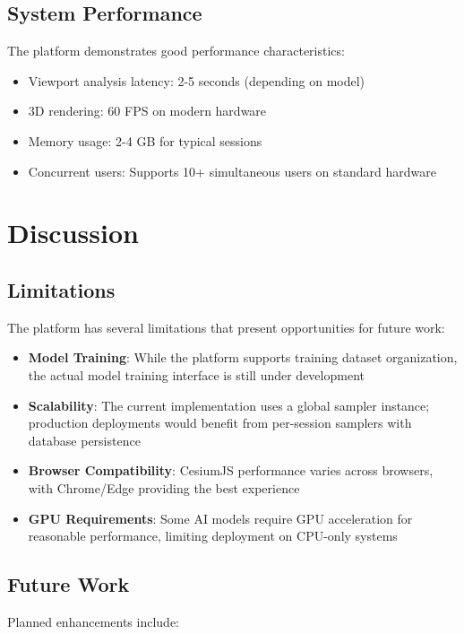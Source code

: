 \documentclass[conference]{IEEEtran}
\begin{document}
\subsection{System Performance}

The platform demonstrates good performance characteristics:
\begin{itemize}
    \item Viewport analysis latency: 2-5 seconds (depending on model)
    \item 3D rendering: 60 FPS on modern hardware
    \item Memory usage: 2-4 GB for typical sessions
    \item Concurrent users: Supports 10+ simultaneous users on standard hardware
\end{itemize}

\section{Discussion}

\subsection{Limitations}

The platform has several limitations that present opportunities for future work:

\begin{itemize}
    \item \textbf{Model Training}: While the platform supports training dataset organization, the actual model training interface is still under development
    \item \textbf{Scalability}: The current implementation uses a global sampler instance; production deployments would benefit from per-session samplers with database persistence
    \item \textbf{Browser Compatibility}: CesiumJS performance varies across browsers, with Chrome/Edge providing the best experience
    \item \textbf{GPU Requirements}: Some AI models require GPU acceleration for reasonable performance, limiting deployment on CPU-only systems
\end{itemize}

\subsection{Future Work}

Planned enhancements include:
\end{document}
